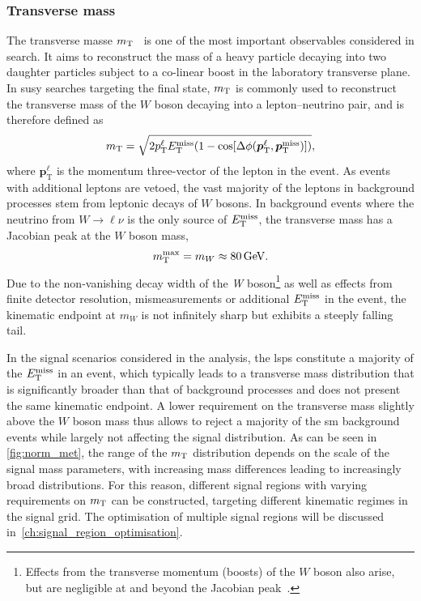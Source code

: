 \subsubsection{Transverse mass}

The transverse masse $m_{\textrm{T}}$~\cite{Arnison:1983rp,transversemass:163856} is one of the most important observables considered in \onelepton search. It aims to reconstruct the mass of a heavy particle decaying into two daughter particles subject to a co-linear boost in the laboratory transverse plane. In \gls{susy} searches targeting the \onelepton final state, $m_{\textrm{T}}$ is commonly used to reconstruct the transverse mass of the $W$ boson decaying into a lepton--neutrino pair, and is therefore defined as
\begin{equation}
	m_{\textrm{T}} = \sqrt{2p_{\textrm{T}}^\ell E_{\textrm{T}}^{\textrm{miss}}(1-\cos[\Delta\phi(\boldsymbol{p}_\mathrm{T}^\ell,\boldsymbol{p}_\mathrm{T}^\mathrm{miss})])},
\end{equation}
where $\boldsymbol{p}_\mathrm{T}^\ell$ is the momentum three-vector of the lepton in the event. As events with additional leptons are vetoed, the vast majority of the leptons in background processes stem from leptonic decays of $W$ bosons. In background events where the neutrino from $W\rightarrow\ell\nu$ is the only source of $E_{\textrm{T}}^{\textrm{miss}}$, the transverse mass has a Jacobian peak at the $W$ boson mass, 
\begin{equation}
	\mt^\mathrm{max} = m_W \approx \SI{80}{\GeV}.
\end{equation}
Due to the non-vanishing decay width of the \textit{W} boson\footnote{Effects from the transverse momentum (\ie boosts) of the $W$ boson also arise, but are negligible at and beyond the Jacobian peak~\cite{Baur:2003jy,Smith:1983aa}.} as well as effects from finite detector resolution, mismeasurements or additional $E_{\textrm{T}}^{\textrm{miss}}$ in the event, the kinematic endpoint at $m_W$ is not infinitely sharp but exhibits a steeply falling tail.

In the signal scenarios considered in the analysis, the \glspl{lsp} constitute a majority of the $E_{\textrm{T}}^{\textrm{miss}}$ in an event, which typically leads to a transverse mass distribution that is significantly broader than that of background processes and does not present the same kinematic endpoint. A lower requirement on the transverse mass slightly above the $W$ boson mass thus allows to reject a majority of the \gls{sm} background events while largely not affecting the signal distribution. As can be seen in \cref{fig:norm_met}, the range of the $m_{\textrm{T}}$ distribution depends on the scale of the signal mass parameters, with increasing mass differences leading to increasingly broad distributions. For this reason, different signal regions with varying requirements on $m_{\textrm{T}}$ can be constructed, targeting different kinematic regimes in the signal grid. The optimisation of multiple signal regions will be discussed in~\cref{ch:signal_region_optimisation}.

